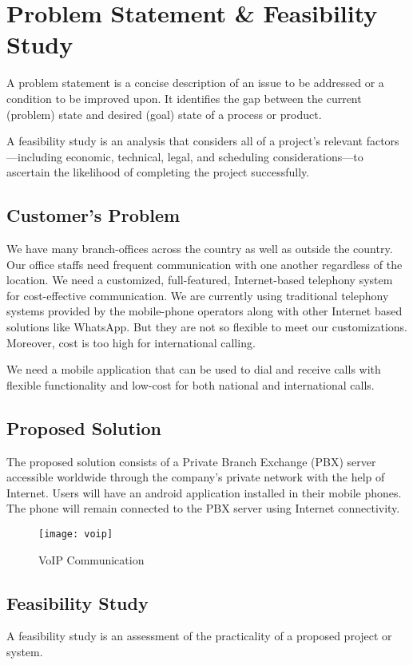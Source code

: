 \chapter{Problem Statement \& Feasibility Study}
A problem statement is a concise description of an issue to be addressed or a condition to be improved upon. It identifies the gap between the current (problem) state and desired (goal) state of a process or product.

A feasibility study is an analysis that considers all of a project's relevant factors—including economic, technical, legal, and scheduling considerations—to ascertain the likelihood of completing the project successfully.

\section{Customer's Problem}
We have many branch-offices across the country as well as outside the country. Our office staffs need frequent communication with one another regardless of the location. We need a customized, full-featured, Internet-based telephony system for cost-effective communication. We are currently using traditional telephony systems provided by the mobile-phone operators along with other Internet based solutions like WhatsApp. But they are not so flexible to meet our customizations. Moreover, cost is too high for international calling.

We need a mobile application that can be used to dial and receive calls with flexible functionality and low-cost for both national and international calls.

\section{Proposed Solution}
The proposed solution consists of a Private Branch Exchange (PBX) server accessible worldwide through the company's private network with the help of Internet. Users will have an android application installed in their mobile phones. The phone will remain connected to the PBX server using Internet connectivity.

\begin{figure}[H]
    \centering
    \texttt{[image: voip]}
    \caption{VoIP Communication}
    \label{fig:voip}
\end{figure}

\section{Feasibility Study}
A feasibility study is an assessment of the practicality of a proposed project or system.

